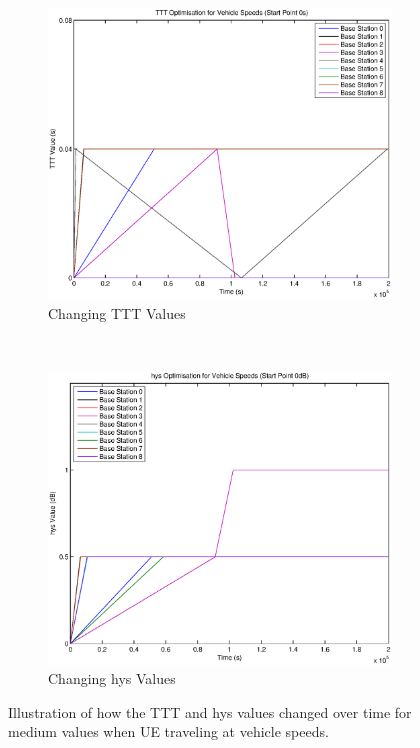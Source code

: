 \begin{figure}[H]
        \centering
        \begin{subfigure}[b]{0.49\textwidth}
                \includegraphics[width=\textwidth]{figures/vehicle_figures/low/long_ttt.eps}
                \caption{Changing TTT Values}
                \label{fig:veh_low_ttt}
        \end{subfigure}%
        ~ %
        \begin{subfigure}[b]{0.49\textwidth}
                \includegraphics[width=\textwidth]{figures/vehicle_figures/low/long_hys.eps}
                \caption{Changing hys Values}
                \label{fig:veh_low_hys}
        \end{subfigure}
        \caption{Illustration of how the TTT and hys values changed over time for medium values when UE traveling at vehicle speeds.}\label{fig:vel_low_ttthys}
\end{figure}

